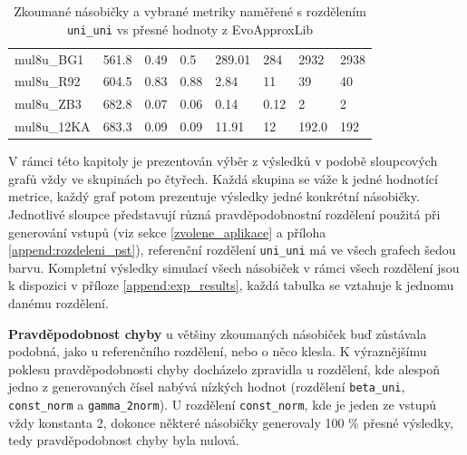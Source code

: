 \begin{table}[H]
{\begin{tabular}{|l|l|ll|ll|ll|}
mul8u\_BG1         & 561.8           & \multicolumn{1}{l|}{0.49}                            & 0.5                                     & \multicolumn{1}{l|}{289.01}                             & 284                                     & \multicolumn{1}{l|}{2932}                              & 2938                                     \\
mul8u\_R92         & 604.5           & \multicolumn{1}{l|}{0.83}                            & 0.88                                    & \multicolumn{1}{l|}{2.84}                               & 11                                      & \multicolumn{1}{l|}{39}                                & 40                                       \\
mul8u\_ZB3         & 682.8           & \multicolumn{1}{l|}{0.07}                            & 0.06                                    & \multicolumn{1}{l|}{0.14}                               & 0.12                                    & \multicolumn{1}{l|}{2}                                 & 2                                        \\
mul8u\_12KA        & 683.3           & \multicolumn{1}{l|}{0.09}                            & 0.09                                    & \multicolumn{1}{l|}{11.91}                              & 12                                      & \multicolumn{1}{l|}{192.0}                             & 192                                     
\end{tabular}}
\caption{Zkoumané násobičky a vybrané metriky naměřené s rozdělením \texttt{uni\_uni} vs přesné hodnoty z EvoApproxLib}
\label{tab:ref_tab}
\end{table}

V rámci této kapitoly je prezentován výběr z výsledků v podobě sloupcových grafů vždy ve skupinách po čtyřech. Každá skupina se váže k jedné hodnotící metrice, každý graf potom prezentuje výsledky jedné konkrétní násobičky. Jednotlivé sloupce představují různá pravděpodobnostní rozdělení použitá při generování vstupů (viz sekce \ref{zvolene_aplikace} a příloha \ref{append:rozdeleni_pst}), referenční rozdělení \texttt{uni\_uni} má ve všech grafech šedou barvu. Kompletní výsledky simulací všech násobiček v rámci všech rozdělení jsou k dispozici v příloze \ref{append:exp_results}, každá tabulka se vztahuje k jednomu danému rozdělení.

\bigskip

\textbf{Pravděpodobnost chyby} u většiny zkoumaných násobiček buď zůstávala podobná, jako u referenčního rozdělení, nebo o něco klesla. K výraznějšímu poklesu pravděpodobnosti chyby docházelo zpravidla u rozdělení, kde alespoň jedno z generovaných čísel nabývá nízkých hodnot (rozdělení \texttt{beta\_uni}, \texttt{const\_norm} a \texttt{gamma\_2norm}). U rozdělení \texttt{const\_norm}, kde je jeden ze vstupů vždy konstanta 2, dokonce některé násobičky generovaly 100 \% přesné výsledky, tedy pravděpodobnost chyby byla nulová. 

